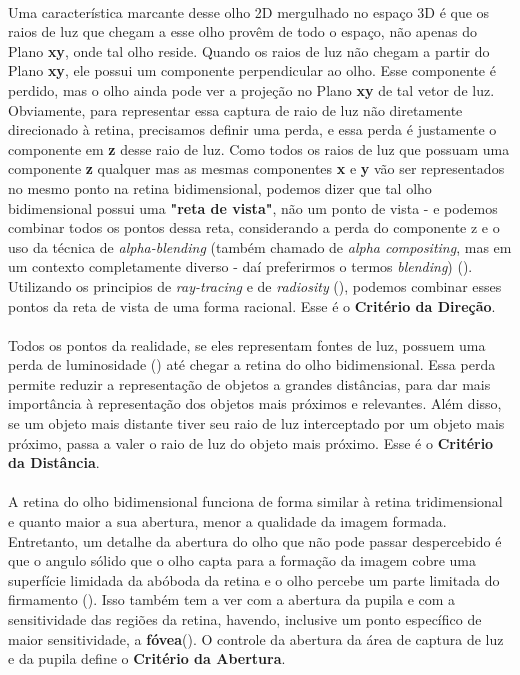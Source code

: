 \documentclass{article}
\begin{document}
	\paragraph{}
	Uma característica marcante desse olho 2D mergulhado no espaço 3D é que os raios de luz que chegam a esse olho provêm de todo o espaço, não apenas do Plano \textbf{xy}, onde tal olho reside. Quando os raios de luz não chegam a partir do Plano \textbf{xy}, ele possui um componente perpendicular ao olho. Esse componente é perdido, mas o olho ainda pode ver a projeção no Plano \textbf{xy} de tal vetor de luz. Obviamente, para representar essa captura de raio de luz não diretamente direcionado à retina, precisamos definir uma perda, e essa perda é justamente o componente em \textbf{z} desse raio de luz. Como todos os raios de luz que possuam uma componente \textbf{z} qualquer mas as mesmas componentes \textbf{x} e \textbf{y} vão ser representados no mesmo ponto na retina bidimensional, podemos dizer que tal olho bidimensional possui uma \textbf{"reta de vista"}, não um ponto de vista - e podemos combinar todos os pontos dessa reta, considerando a perda do componente z e o uso da técnica de \textit{alpha-blending} (também chamado de \textit{alpha compositing}, mas em um contexto completamente diverso - daí preferirmos o termos \textit{blending}) (\citep[p.~56]{2015MajiNath}). Utilizando os principios de \textit{ray-tracing} e de \textit{radiosity} (\citep[]{1995CoWall}), podemos combinar esses pontos da reta de vista de uma forma racional. Esse é o \textbf{Critério da Direção}.
	
	\paragraph{}
	Todos os pontos da realidade, se eles representam fontes de luz, possuem uma perda de luminosidade (\cite{2012Bukshtab}) até chegar a retina do olho bidimensional. Essa perda permite reduzir a representação de objetos a grandes distâncias, para dar mais importância à representação dos objetos mais próximos e relevantes. Além disso, se um objeto mais distante tiver seu raio de luz interceptado por um objeto mais próximo, passa a valer o raio de luz do objeto mais próximo. Esse é o \textbf{Critério da Distância}.
	
	\paragraph{}
	A retina do olho bidimensional funciona de forma similar à retina tridimensional e quanto maior a sua abertura, menor a qualidade da imagem formada. Entretanto, um detalhe da abertura do olho que não pode passar despercebido é que o angulo sólido que o olho capta para a formação da imagem cobre uma superfície limidada da abóboda da retina e o olho percebe um parte limitada do firmamento (\cite{2018Diaz}). Isso também tem a ver com a abertura da pupila e com a sensitividade das regiões da retina, havendo, inclusive um ponto específico de maior sensitividade, a \textbf{fóvea}(\cite{2022Rehman}). O controle da abertura da área de captura de luz e da pupila define o \textbf{Critério da Abertura}.
	
\end{document}
